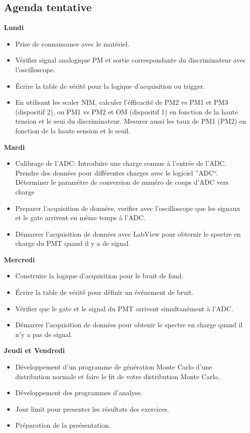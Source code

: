 \subsection{Agenda tentative}
\textbf{Lundi}
\begin{itemize}
\item Prise de connaissance avec le mat\'eriel.
\item V\'erifier signal analogique PM et sortie correspondante du discriminateur avec l'oscilloscope.
\item \'Ecrire la table de v\'erit\'e pour la logique d'acquisition ou trigger.
\item En utilisant les scaler NIM, calculer l’\'efficacit\'e de PM2 vs PM1 et PM3 (dispositif 2), ou PM1 vs PM2 et OM (dispositif 1) en fonction de la haute tension et le seui du discriminateur. Mesurer aussi les taux de PM1 (PM2) en fonction de la haute sension et le seuil.
\end{itemize}
\vspace{\baselineskip}
\textbf{Mardi}
\begin{itemize}
\item Calibrage de l'ADC: Introduire une charge connue \`a l'entr\'ee de l’ADC. Prendre des donn\'ees pour diff\'erentes charges avec le logiciel ''ADC``. D\'eterminer le param\`etre de conversion de num\'ero de coups d’ADC vers charge
\item Preparer l'acquisition de donn\'ees, verifier avec l'oscilloscope que les signaux et le gate arrivent en m\^eme temps \`a l'ADC.
\item D\'emarrer l'acquisition de donn\'ees avec LabView pour obternir le spectre en charge du PMT quand il y a de signal.
\end{itemize}
\vspace{\baselineskip}
\textbf{Mercredi}
\begin{itemize}
\item Construire la logique d'acquisition pour le bruit de fond.
\item \'Ecrire la table de v\'erit\'e pour d\'efinir un \'ev\'enement de bruit.
\item V\'erifier que le gate et le signal du PMT arrivent simultan\'ement \`a l'ADC.
\item D\'emarrer l'acquisition de donn\'ees pour obtenir le spectre en charge quand il n'y a pas de signal.
\end{itemize}
\vspace{\baselineskip}
\textbf{Jeudi et Vendredi}
\begin{itemize}
\item D\'eveloppement d'un programme de g\'en\'eration Monte Carlo d'une distribution normale et faire le fit de votre distribution Monte Carlo.
\item D\'eveloppement des programmes d'analyse.
\item Jour limit pour presenter les r\'esultats des exercices.
\item Pr\'eparation de la pre\'esentation.
\end{itemize}

\pagebreak
